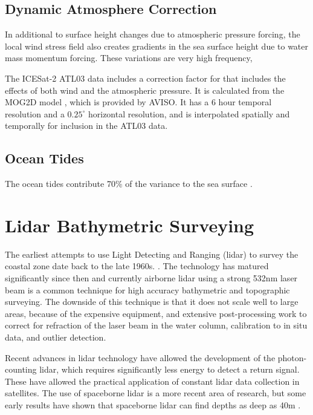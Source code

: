 \subsection{Dynamic Atmosphere Correction}
In additional to surface height changes due to atmospheric pressure forcing, the local wind stress field also creates gradients in the sea surface height due to water mass momentum forcing. These variations are very high frequency,

The ICESat-2 ATL03 data includes a correction factor for that includes the effects of both wind and the atmospheric pressure. It is calculated from the MOG2D model \parencite{LeProvost1994}, which is provided by AVISO. It has a 6 hour temporal resolution and a $0.25^{\circ}$ horizontal resolution, and is interpolated spatially and temporally for inclusion in the ATL03 data.

\subsection{Ocean Tides}



The ocean tides contribute 70\% of the variance to the sea surface \parencite{icesat2 comparison guide}.


\section{Lidar Bathymetric Surveying}

The earliest attempts to use Light Detecting and Ranging (lidar) to survey the coastal zone date back to the late 1960s. \parencite{Bailly2016}. The technology has matured significantly since then and currently airborne lidar using a strong 532nm laser beam is a common technique for high accuracy bathymetric and topographic surveying. The downside of this technique is that it does not scale well to large areas, because of the expensive equipment, and extensive post-processing work to correct for refraction of the laser beam in the water column, calibration to in situ data, and outlier detection.

Recent advances in lidar technology have allowed the development of the photon-counting lidar, which requires significantly less energy to detect a return signal. These have allowed the practical application of constant lidar data collection in satellites. The use of spaceborne lidar is a more recent area of research, but some early results have shown that spaceborne lidar can find depths as deep as 40m \parencite{Parrish2019}.

